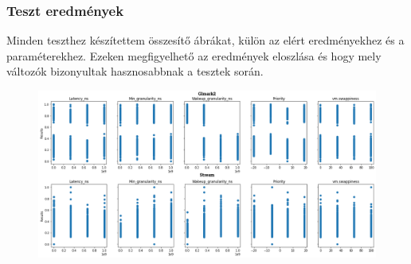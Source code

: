 \documentclass{beamer}
\begin{document}
\begin{frame}
\frametitle{Teszt eredmények}

Minden teszthez készítettem összesítő ábrákat, külön az elért eredményekhez és a paraméterekhez.
Ezeken megfigyelhető az eredmények eloszlása és hogy mely változók bizonyultak hasznosabbnak a tesztek során.

\begin{figure}
\begin{center}
\includegraphics[height=0.5\textheight]{images/graphicsAndMemoryBenchmarkValue.png}
\end{center}	
\end{figure}

\end{frame}
\end{document}
